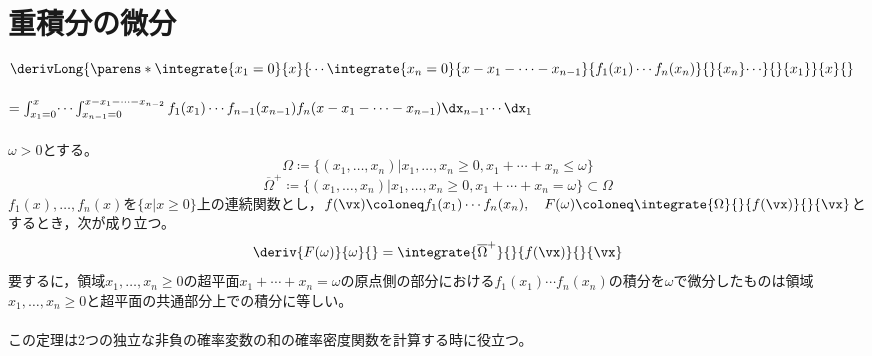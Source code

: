     \section{
        重積分の微分\texorpdfstring{\\}{}
        \small{
            \texorpdfstring{$\derivLong{\parens*{\integrate{x_1=0}{x}{\dotsi\integrate{x_n=0}{x-x_1-\dotsb-x_{n-1}}{f_1(x_1)\dotsm f_n(x_n)}{}{x_n}\dotsi}{}{x_1}}}{x}{}$}{} \texorpdfstring{\\}{}
            \texorpdfstring{$= \int_{x_1=0}^x\dotsi\int_{x_{n-1}=0}^{x-x_1-\dotsb -x_{n-2}} f_1(x_1)\dotsm f_{n-1}(x_{n-1})f_n(x-x_1-\dotsb-x_{n-1}) \dx_{n-1}\dotsi\dx_{1}$}{}
        }
    }
        \label{重積分の微分}
        \begin{shadebox}
            $\omega>0$とする。
            \[\Omega\coloneq\{(x_1,\dotsc,x_n)|x_1,\dotsc,x_n\geq 0, x_1+\dotsb+x_n \leq \omega\}\]
            \[\overline{\Omega}^+\coloneq\{(x_1,\dotsc,x_n)|x_1,\dotsc,x_n\geq 0, x_1+\dotsb+x_n = \omega\} \subset \Omega\]
            $f_1(x),\dotsc,f_n(x)$を$\{x|x\geq 0\}$上の連続関数とし，$f(\vx)\coloneq f_1(x_1)\dotsm f_n(x_n),\quad F(\omega) \coloneq \integrate{\Omega}{}{f(\vx)}{}{\vx}$とするとき，次が成り立つ。
            \[\deriv{F(\omega)}{\omega}{} = \integrate{\overline{\Omega}^+}{}{f(\vx)}{}{\vx}\]
            要するに，領域$x_1,\dotsc,x_n\geq 0$の超平面$x_1+\dotsb+x_n=\omega$の原点側の部分における$f_1(x_1)\dotsm f_n(x_n)$の積分を$\omega$で微分したものは領域$x_1,\dotsc,x_n\geq 0$と超平面の共通部分上での積分に等しい。\\
            \\
            \quad この定理は2つの独立な非負の確率変数の和の確率密度関数を計算する時に役立つ。
        \end{shadebox}

